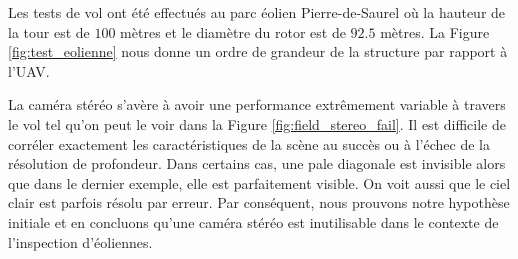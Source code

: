 Les tests de vol ont été effectués au parc éolien Pierre-de-Saurel où la hauteur de la tour est de $100$ mètres et le diamètre du rotor est de $92.5$ mètres. La Figure \ref{fig:test_eolienne} nous donne un ordre de grandeur de la structure par rapport à l'UAV.

%

La caméra stéréo s'avère à avoir une performance extrêmement variable à travers le vol tel qu'on peut le voir dans la Figure \ref{fig:field_stereo_fail}. Il est difficile de corréler exactement les caractéristiques de la scène au succès ou à l'échec de la résolution de profondeur. Dans certains cas, une pale diagonale est invisible alors que dans le dernier exemple, elle est parfaitement visible. On voit aussi que le ciel clair est parfois résolu par erreur. Par conséquent, nous prouvons notre hypothèse initiale et en concluons qu'une caméra stéréo est inutilisable dans le contexte de l'inspection d'éoliennes.

